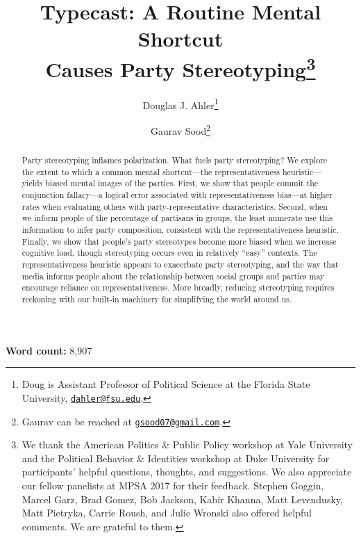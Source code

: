 \documentclass[12pt, letterpaper]{article}
\title{Typecast: A Routine Mental Shortcut \\ Causes Party Stereotyping\footnote{We thank the American Politics \& Public Policy workshop at Yale University and the Political Behavior \& Identities workshop at Duke University for participants' helpful questions, thoughts, and suggestions. We also appreciate our fellow panelists at MPSA 2017 for their feedback. Stephen Goggin, Marcel Garz, Brad Gomez, Bob Jackson, Kabir Khanna, Matt Levendusky, Matt Pietryka, Carrie Roush, and Julie Wronski also offered helpful comments. We are grateful to them.}}
\author{Douglas J. Ahler\thanks{Doug is Assistant Professor of Political Science at the Florida State University, \href{mailto:dahler@fsu.edu}{\texttt{dahler@fsu.edu}}.} \and Gaurav Sood\thanks{Gaurav can be reached at \href{mailto:gsood07@gmail.com}{\texttt{gsood07@gmail.com}}.}}
\begin{document}
\maketitle
\begin{center}
\textbf{Word count:}  8,907
\end{center}
\thispagestyle{empty}

\begin{abstract}

\noindent Party stereotyping inflames polarization. What fuels party stereotyping? We explore the extent to which a common mental shortcut---the representativeness heuristic---yields biased mental images of the parties. First, we show that people commit the conjunction fallacy---a logical error associated with representativeness bias---at higher rates when evaluating others with party-representative characteristics. Second, when we inform people of the percentage of partisans in groups, the least numerate use this information to infer party composition, consistent with the representativeness heuristic. Finally, we show that people's party stereotypes become more biased when we increase cognitive load, though stereotyping occurs even in relatively ``easy'' contexts. The representativeness heuristic appears to exacerbate party stereotyping, and the way that media informs people about the relationship between social groups and parties may encourage reliance on representativeness. More broadly, reducing stereotyping requires reckoning with our built-in machinery for simplifying the world around us.



\end{abstract}
\end{document}
